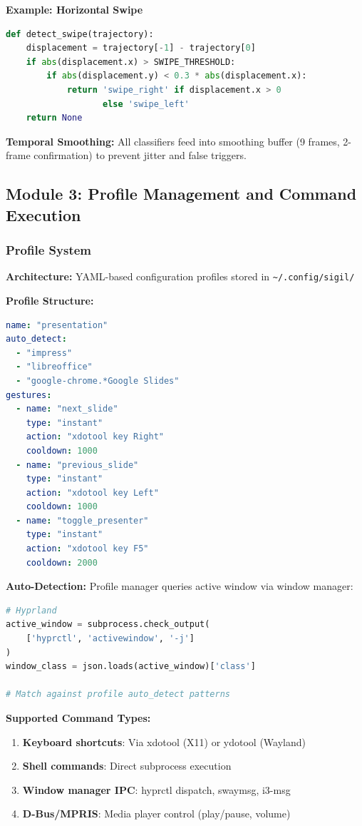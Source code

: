 \documentclass[11pt,a4paper]{article}
\begin{document}
\textbf{Example: Horizontal Swipe}
\begin{lstlisting}[language=Python]
def detect_swipe(trajectory):
    displacement = trajectory[-1] - trajectory[0]
    if abs(displacement.x) > SWIPE_THRESHOLD:
        if abs(displacement.y) < 0.3 * abs(displacement.x):
            return 'swipe_right' if displacement.x > 0 
                   else 'swipe_left'
    return None
\end{lstlisting}

\textbf{Temporal Smoothing:} All classifiers feed into smoothing buffer (9 frames, 2-frame confirmation) to prevent jitter and false triggers.

\subsection{Module 3: Profile Management and Command Execution}

\subsubsection{Profile System}

\textbf{Architecture:} YAML-based configuration profiles stored in \texttt{\textasciitilde/.config/sigil/}

\textbf{Profile Structure:}
\begin{lstlisting}[language=yaml]
name: "presentation"
auto_detect:
  - "impress"
  - "libreoffice"
  - "google-chrome.*Google Slides"
gestures:
  - name: "next_slide"
    type: "instant"
    action: "xdotool key Right"
    cooldown: 1000
  - name: "previous_slide"
    type: "instant"
    action: "xdotool key Left"
    cooldown: 1000
  - name: "toggle_presenter"
    type: "instant"
    action: "xdotool key F5"
    cooldown: 2000
\end{lstlisting}

\textbf{Auto-Detection:} Profile manager queries active window via window manager:
\begin{lstlisting}[language=Python]
# Hyprland
active_window = subprocess.check_output(
    ['hyprctl', 'activewindow', '-j']
)
window_class = json.loads(active_window)['class']

# Match against profile auto_detect patterns
\end{lstlisting}

\textbf{Supported Command Types:}
\begin{enumerate}
\item \textbf{Keyboard shortcuts}: Via xdotool (X11) or ydotool (Wayland)
\item \textbf{Shell commands}: Direct subprocess execution
\item \textbf{Window manager IPC}: hyprctl dispatch, swaymsg, i3-msg
\item \textbf{D-Bus/MPRIS}: Media player control (play/pause, volume)
\end{enumerate}
\end{document}
